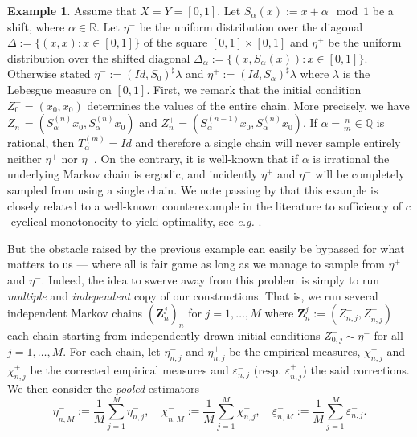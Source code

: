 \documentclass[leqno, 11pt, a4paper]{amsart}
\theoremstyle{definition}
\newtheorem{ex}{Example}
\newcommand{\cZ}{\mathbf{Z}}
\newcommand{\R}{\mathbb{R}}
\newcommand{\Q}{\mathbb{Q}}
\newcommand{\eps}{\varepsilon}
\begin{document}
\begin{ex}
	Assume that $X = Y = [0,1]$. Let $S_\alpha(x) := x + \alpha \mod{1}$ be a shift, where $\alpha \in \R$. Let $\eta^-$ be the uniform distribution over the diagonal $\Delta := \{(x, x) : x \in [0,1]\}$ of the square $[0,1] \times [0,1]$ and $\eta^+$ be the uniform distribution over the shifted diagonal $\Delta_{\alpha} := \{(x, S_\alpha(x)):x \in [0,1]\}$. Otherwise stated $\eta^- := (Id, S_0)^\sharp \lambda$ and $\eta^+ := (Id, S_\alpha)^\sharp \lambda$ where $\lambda$ is the Lebesgue measure on $[0, 1]$. First, we remark that the initial condition $Z_0^- = (x_0, x_0)$ determines the values of the entire chain. More precisely, we have $Z_n^- = (S_\alpha^{(n)}x_0,S_\alpha^{(n)}x_0)$ and $Z_n^+ = (S_\alpha^{(n-1)} x_0, S_\alpha^{(n)} x_0 )$. If $\alpha = \frac{n}{m} \in \Q$  is rational, then $T_\alpha^{(m)} = Id$ and therefore a single chain will never sample entirely neither $\eta^+$ nor $\eta^-$. On the contrary, it is well-known that if $\alpha$ is irrational the underlying Markov chain is ergodic, and incidently $\eta^+$ and $\eta^-$ will be completely sampled from using a single chain. We note passing by that this example is closely related to a well-known counterexample in the literature to sufficiency of $c$-cyclical monotonocity to yield optimality, see \textit{e.g.} \cite[Example 1.2]{beiglbockOptimalBetterTransport2009}. 
\end{ex}
But the obstacle raised by the previous example can easily be bypassed for what matters to us — where all is fair game as long as we manage to sample from $\eta^+$ and $\eta^-$. Indeed, the idea to swerve away from this problem is simply to run \textit{multiple} and \textit{independent} copy of our  constructions. That is, we run several independent Markov chains $(\cZ_n^{j})_n$ for $j = 1, \dots, M$ where $\cZ_n^j := (Z_{n, j}^-, Z_{n, j}^+)$ each chain starting from independently drawn initial conditions $Z_{0, j}^- \sim \eta^-$ for all $j =1,\dots, M$. For each chain, let $\eta^-_{n,j}$ and $\eta^+_{n, j}$ be the empirical measures, $\chi^-_{n,j}$ and $\chi^+_{n,j}$ be the corrected empirical measures and $\eps^-_{n,j}$ (resp. $\eps^+_{n, j}$) the said corrections. We then consider the \textit{pooled} estimators
\begin{equation*}\label{eq:Lambdas-and-E}
	\underline{\eta}^-_{n, M} := \frac{1}{M} \sum_{j = 1}^M \eta^{-}_{n, j}, \quad  \underline{\chi}^-_{n,M} := \frac{1}{M} \sum_{j = 1}^M \chi^{-}_{n, j}, \quad \underline{\eps}^-_{n, M} := \frac1M \sum_{j = 1}^M \eps^-_{n, j}.
\end{equation*}
\end{document}
